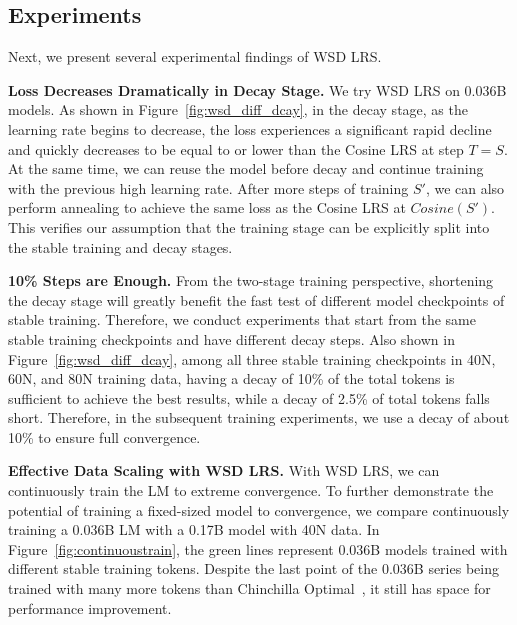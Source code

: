 \vspace{-6mm}
\subsection{Experiments}
\label{sec:wsd_experiments_continoustrain}
Next, we present several experimental findings of WSD LRS.

\textbf{Loss Decreases Dramatically in Decay Stage. } We try WSD LRS on 0.036B models. As shown in Figure~\ref{fig:wsd_diff_dcay}, in the decay stage, as the learning rate begins to decrease, the loss experiences a significant rapid decline and quickly decreases to be equal to or lower than the Cosine LRS at step $T=S$. At the same time, we can reuse the model before decay and continue training with the previous high learning rate. After more steps of training $S'$, we can also perform annealing to achieve the same loss as the Cosine LRS at $Cosine(S')$. This verifies our assumption that the training stage can be explicitly split into the stable training and decay stages.

\textbf{10\% Steps are Enough.} From the two-stage training perspective, shortening the decay stage will greatly benefit the fast test of different model checkpoints of stable training. Therefore, we conduct experiments that start from the same stable training checkpoints and have different decay steps. Also shown in Figure~\ref{fig:wsd_diff_dcay}, among all three stable training checkpoints in 40N, 60N, and 80N training data, having a decay of 10\% of the total tokens is sufficient to achieve the best results, while a decay of 2.5\% of total tokens falls short. Therefore, in the subsequent training experiments, we use a decay of about 10\% to ensure full convergence. 

\textbf{Effective Data Scaling with WSD LRS.} With WSD LRS, we can continuously train the LM to extreme convergence. To further demonstrate the potential of training a fixed-sized model to convergence, we compare continuously training a 0.036B LM with a 0.17B model with 40N data. 
In Figure~\ref{fig:continuoustrain}, the green lines represent 0.036B models trained with different stable training tokens. Despite the last point of the 0.036B series being trained with many more tokens than Chinchilla Optimal~\citep{hoffmann2022training}, it still has space for performance improvement. 



